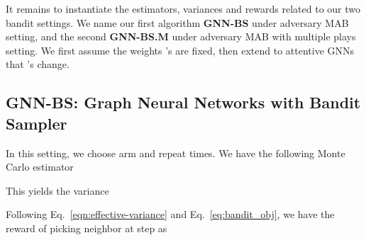 \documentclass{article}
\begin{document}
It remains to instantiate the estimators, variances
and rewards related to our two bandit settings.
We name our first algorithm \textbf{GNN-BS} under
adversary MAB setting, and the second \textbf{GNN-BS.M}
under adversary MAB with multiple plays setting.
We first assume the weights 's are fixed,
then extend to attentive GNNs that
's change.







\subsection{GNN-BS: Graph Neural Networks with Bandit Sampler}\label{sec:bs}


In this setting, we choose  arm and 
repeat  times. We have the
following Monte Carlo estimator 

This yields the variance

Following Eq.~\eqref{eqn:effective-variance} and Eq.~\eqref{eq:bandit_obj}, 
we have the reward of  picking neighbor  at step  as 



\begin{comment}
We describe our training algorithm in Algorithm~\ref{alg:train_gnn}.
At each iteration , we read a minibatch of labeled vertices.
We randomly sample the layers in a top-down manner by using our
maintained sampling distribution 's. 
We do feedward by using our Monte Carlo estimator~\eqref{eq:estimator1}.
After we update the GNN model, 
we collect rewards defined in Eq.~\eqref{eq:reward1}, 
and update the sampling distribution 's 
using \textbf{EXP3}~\cite{auer2002nonstochastic}, which 
is a simple adversary MAB algorithm.
The parameter  in EXP3 controls how fast the 
sampling distribution  deviates from the uniform,
and  controls how fast the probability mass 
on a single location can change.
\end{comment}

\begin{comment}
\begin{algorithm}
\caption{DepRound}
\label{alg:dep_round}
\begin{algorithmic}[1]
\State \textbf{Input:} Sample size , sample distribution  with 
\State \textbf{Output:} Subset of  with  elements
\While{there is an  with }
    \State Choose distinct  and  with  and 
    \State Set  and  
    \State Update  and  as
    
\EndWhile
\State \textbf{return} 
\end{algorithmic}
\end{algorithm}
\end{comment}
\end{document}
